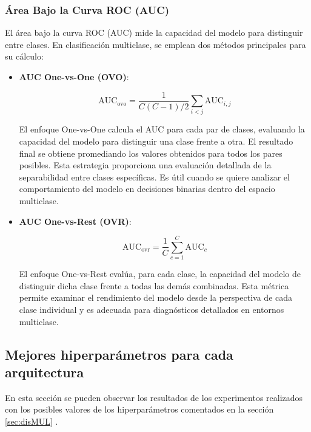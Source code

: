 \subsubsection*{Área Bajo la Curva ROC (AUC)}

El área bajo la curva ROC (AUC) mide la capacidad del modelo para distinguir entre clases. En clasificación multiclase, se emplean dos métodos principales para su cálculo:

\begin{itemize}

\item \textbf{AUC One-vs-One (OVO)}:

\begin{equation}
\text{AUC}_{\text{ovo}} = \frac{1}{C(C-1)/2} \sum_{i<j} \text{AUC}_{i,j}
\end{equation}

El enfoque One-vs-One calcula el AUC para cada par de clases, evaluando la capacidad del modelo para distinguir una clase frente a otra. El resultado final se obtiene promediando los valores obtenidos para todos los pares posibles. Esta estrategia proporciona una evaluación detallada de la separabilidad entre clases específicas. Es útil cuando se quiere analizar el comportamiento del modelo en decisiones binarias dentro del espacio multiclase.

\item \textbf{AUC One-vs-Rest (OVR)}:

\begin{equation}
\text{AUC}_{\text{ovr}} = \frac{1}{C} \sum_{c=1}^{C} \text{AUC}_c
\end{equation}

El enfoque One-vs-Rest evalúa, para cada clase, la capacidad del modelo de distinguir dicha clase frente a todas las demás combinadas. Esta métrica permite examinar el rendimiento del modelo desde la perspectiva de cada clase individual y es adecuada para diagnósticos detallados en entornos multiclase.

\end{itemize}


\subsection{Mejores hiperparámetros para cada arquitectura}
En esta sección se pueden observar los resultados de los experimentos realizados con los posibles valores de los hiperparámetros comentados en la sección \ref{sec:disMUL} .

